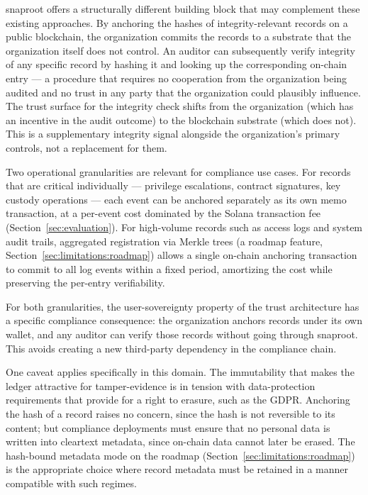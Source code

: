 \documentclass[11pt,a4paper]{article}
\begin{document}
snaproot offers a structurally different building block that may
complement these existing approaches. By anchoring the hashes of
integrity-relevant records on a public blockchain, the organization
commits the records to a substrate that the organization itself does
not control. An auditor can subsequently verify integrity of any
specific record by hashing it and looking up the corresponding
on-chain entry --- a procedure that requires no cooperation from the
organization being audited and no trust in any party that the
organization could plausibly influence. The trust surface for the
integrity check shifts from the organization (which has an incentive
in the audit outcome) to the blockchain substrate (which does not).
This is a supplementary integrity signal alongside the organization's
primary controls, not a replacement for them.

Two operational granularities are relevant for compliance use cases.
For records that are critical individually --- privilege escalations,
contract signatures, key custody operations --- each event can be
anchored separately as its own memo transaction, at a per-event cost
dominated by the Solana transaction fee
(Section~\ref{sec:evaluation}). For high-volume records such
as access logs and system audit trails, aggregated registration via
Merkle trees (a roadmap feature,
Section~\ref{sec:limitations:roadmap}) allows a single on-chain
anchoring transaction to commit to all log events within a fixed
period, amortizing the cost while preserving the per-entry
verifiability.

For both granularities, the user-sovereignty property of the trust
architecture has a specific compliance consequence: the organization
anchors records under its own wallet, and any auditor can verify those
records without going through snaproot. This avoids creating a new
third-party dependency in the compliance chain.

One caveat applies specifically in this domain. The immutability that
makes the ledger attractive for tamper-evidence is in tension with
data-protection requirements that provide for a right to erasure, such
as the GDPR. Anchoring the hash of a record raises no concern, since
the hash is not reversible to its content; but compliance deployments
must ensure that no personal data is written into cleartext metadata,
since on-chain data cannot later be erased. The hash-bound metadata
mode on the roadmap (Section~\ref{sec:limitations:roadmap}) is the
appropriate choice where record metadata must be retained in a manner
compatible with such regimes.
\end{document}
